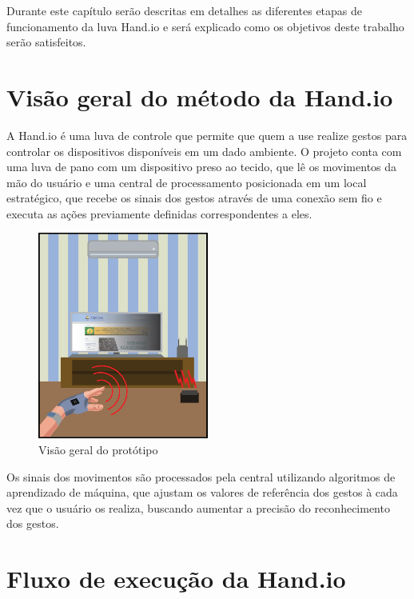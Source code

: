 Durante este capítulo serão descritas em detalhes as diferentes etapas de funcionamento da luva Hand.io e será explicado como os objetivos deste trabalho serão satisfeitos.

\section{Visão geral do método da Hand.io}

A Hand.io é uma luva de controle que permite que quem a use realize gestos para controlar os dispositivos disponíveis em um dado ambiente. O projeto conta com uma luva de pano com um dispositivo preso ao tecido, que lê os movimentos da mão do usuário e uma central de processamento posicionada em um local estratégico, que recebe os sinais dos gestos através de uma conexão sem fio e executa as ações previamente definidas correspondentes a eles.

\begin{figure}[ht]
    \centering
    \includegraphics[width=0.5\textwidth, keepaspectratio]{resources/bigpicture.jpeg}
    \caption{Visão geral do protótipo}
    \label{fig:bigpicture}
\end{figure}

Os sinais dos movimentos são processados pela central utilizando algoritmos de aprendizado de máquina, que ajustam os valores de referência dos gestos à cada vez que o usuário os realiza, buscando aumentar a precisão do reconhecimento dos gestos.


\section{Fluxo de execução da Hand.io}

